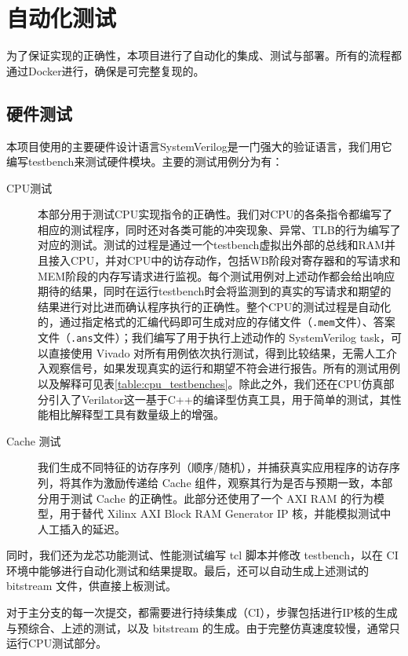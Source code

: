 \chapter{自动化测试}

为了保证实现的正确性，本项目进行了自动化的集成、测试与部署。所有的流程都通过Docker进行，确保是可完整复现的。

\section{硬件测试}
\label{section:test_hardware}

本项目使用的主要硬件设计语言SystemVerilog是一门强大的验证语言，我们用它编写testbench来测试硬件模块。主要的测试用例分为有：

\begin{description}
    \item[CPU测试] 本部分用于测试CPU实现指令的正确性。我们对CPU的各条指令都编写了相应的测试程序，同时还对各类可能的冲突现象、异常、TLB的行为编写了对应的测试。测试的过程是通过一个testbench虚拟出外部的总线和RAM并且接入CPU，并对CPU中的访存动作，包括WB阶段对寄存器和的写请求和MEM阶段的内存写请求进行监视。每个测试用例对上述动作都会给出响应期待的结果，同时在运行testbench时会将监测到的真实的写请求和期望的结果进行对比进而确认程序执行的正确性。整个CPU的测试过程是自动化的，通过指定格式的汇编代码即可生成对应的存储文件（\texttt{.mem}文件）、答案文件（\texttt{.ans}文件）；我们编写了用于执行上述动作的 SystemVerilog task，可以直接使用 Vivado 对所有用例依次执行测试，得到比较结果，无需人工介入观察信号，如果发现真实的运行和期望不符会进行报告。所有的测试用例以及解释可见表\ref{table:cpu_testbenches}。除此之外，我们还在CPU仿真部分引入了Verilator这一基于C++的编译型仿真工具，用于简单的测试，其性能相比解释型工具有数量级上的增强。
    \item[Cache 测试] 我们生成不同特征的访存序列（顺序/随机），并捕获真实应用程序的访存序列，将其作为激励传递给 Cache 组件，观察其行为是否与预期一致，本部分用于测试 Cache 的正确性。此部分还使用了一个 AXI RAM 的行为模型，用于替代 Xilinx AXI Block RAM Generator IP 核，并能模拟测试中人工插入的延迟。

\end{description}

同时，我们还为龙芯功能测试、性能测试编写 tcl 脚本并修改 testbench，以在 CI 环境中能够进行自动化测试和结果提取。最后，还可以自动生成上述测试的 bitstream 文件，供直接上板测试。

对于主分支的每一次提交，都需要进行持续集成（CI），步骤包括进行IP核的生成与预综合、上述的测试，以及 bitstream 的生成。由于完整仿真速度较慢，通常只运行CPU测试部分。


